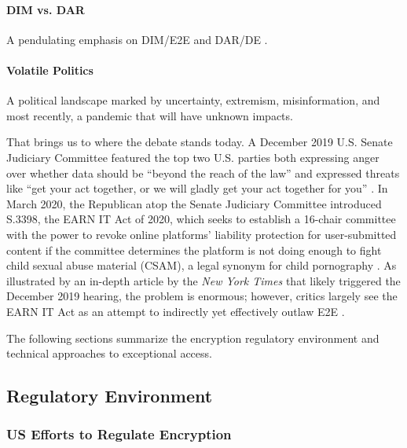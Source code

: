 \paragraph*{DIM vs. DAR} A pendulating emphasis on DIM/E2E and DAR/DE \cite{schneier_2019}.

\paragraph*{Volatile Politics} A political landscape marked by uncertainty, extremism, misinformation, and most
recently, a pandemic that will have unknown impacts.

That brings us to where the debate stands today. A December 2019 U.S. Senate Judiciary Committee featured the top two
U.S. parties both expressing anger over whether data should be ``beyond the reach of the law'' and expressed threats
like ``get your act together, or we will gladly get your act together for you'' \cite{geller_2019}. In March 2020, the
Republican atop the Senate Judiciary Committee introduced S.3398, the EARN IT Act of 2020, which seeks to establish a
16-chair committee with the power to revoke online platforms' liability protection for user-submitted content if the
committee determines the platform is not doing enough to fight child sexual abuse material (CSAM), a legal synonym for
child pornography \cite{graham_s3398_2020}. As illustrated by an in-depth article by the \textit{New York Times}
\cite{keller_internet_2019} that likely triggered the December 2019 hearing, the problem is enormous; however, critics
largely see the EARN IT Act as an attempt to indirectly yet effectively outlaw E2E \cite{newman_2020}
\cite{pfefferkorn_2020}.


The following sections summarize the encryption regulatory environment and technical approaches to exceptional access.

\subsection{Regulatory Environment}
\label{sec-reg-environment}

\subsubsection*{US Efforts to Regulate Encryption}


